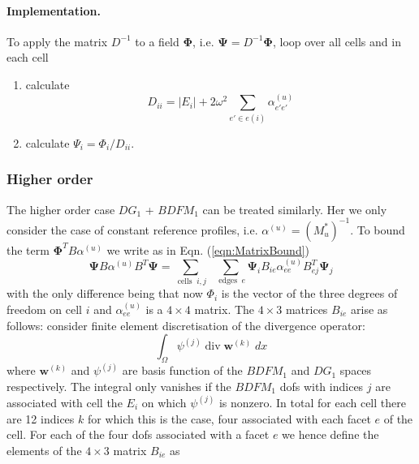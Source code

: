 \documentclass[12pt]{article}
\renewcommand{\vec}[1]{\boldsymbol{#1}}
\begin{document}
\paragraph{Implementation.}
To apply the matrix $D^{-1}$ to a field $\vec{\Phi}$, i.e. $\vec{\Psi}=D^{-1}\vec{\Phi}$, loop over all cells and in each cell
\begin{enumerate}
  \item calculate
\begin{equation}
  D_{ii} = |E_i| + 2\omega^2 \sum_{e'\in e(i)} \alpha^{(u)}_{e'e'}
\end{equation}
  \item calculate $\Psi_i = \Phi_i/D_{ii}$.
\end{enumerate}
\subsubsection{Higher order}
The higher order case $DG_1$ + $BDFM_1$ can be treated similarly. Her we only consider the case of constant reference profiles, i.e. $\alpha^{(u)}=\left(M_u^*\right)^{-1}$.
To bound the term $\vec{\Phi}^T B\alpha^{(u)}$ we write as in Eqn. (\ref{eqn:MatrixBound})
\begin{equation}
  \vec{\Psi} B \alpha^{(u)} B^T \vec{\Psi} = \sum_{\operatorname{cells}\;i,j}\;\;\sum_{\operatorname{edges}\;e} \vec{\Psi}_i B_{ie} \alpha^{(u)}_{ee} B^T_{ej} \vec{\Psi}_j 
\label{eqn:MatrixBoundBDFM1}
\end{equation}
with the only difference being that now $\Phi_i$ is the vector of the three degrees of freedom on cell $i$ and $\alpha^{(u)}_{ee}$ is a $4\times 4$ matrix. The $4\times 3$ matrices $B_{ie}$ arise as follows: consider finite element discretisation of the divergence operator:
\begin{equation}
  \int_{\Omega} \psi^{(j)}\operatorname{div}\vec{w}^{(k)}\; dx
\end{equation}
where $\vec{w}^{(k)}$ and $\psi^{(j)}$ are basis function of the $BDFM_1$ and $DG_1$ spaces respectively. The integral only vanishes if the $BDFM_1$ dofs with indices $j$ are associated with cell the $E_i$ on which $\psi^{(j)}$ is nonzero. In total for each cell there are 12 indices $k$ for which this is the case, four associated with each facet $e$ of the cell. For each of the four dofs associated with a facet $e$ we hence define the elements of the $4\times 3$ matrix $B_{ie}$ as
\end{document}
